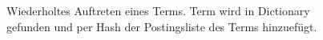 \begin{figure}[ht]
    \caption{
        Wiederholtes Auftreten eines Terms. Term wird in Dictionary gefunden und per Hash der Postingsliste des Terms hinzuefügt.
     }
   \label{fig:subfigure2}
\end{figure}

